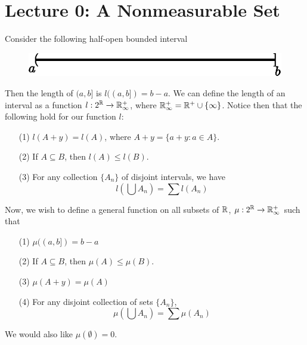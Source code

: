 \section*{Lecture 0: A Nonmeasurable Set}

Consider the following half-open bounded interval
\begin{figure}[h]
    \centering
    \includegraphics[scale=1.0]{Figures/half_open.eps}
    \caption{}
    \label{figure_1}
\end{figure}

Then the length of $(a,b]$ is $l((a,b])=b-a$. We can define the length of an
interval as a function $l:2^{\mathbb{R}} \xrightarrow{} \mathbb{R}^+_\infty$, where
$\mathbb{R}^+_\infty=\mathbb{R}^+ \cup \{\infty\}$. Notice then that the following hold for our
function $l$:
\begin{enumerate}
    \item[(1)] $l(A+y)=l(A)$, where $A+y=\{a+y : a \in A\}$.

    \item[(2)] If $A \subseteq B$, then  $l(A) \leq l(B)$.

    \item[(3)] For any collection $\{A_n\}$ of disjoint intervals, we have
        \begin{equation*}
            l(\bigcup{A_n})=\sum{l(A_n)}
        \end{equation*}
\end{enumerate}

Now, we wish to define a general function on all subsets of $\mathbb{R}$,  $\mu:2^{\mathbb{R}}
\xrightarrow{} \mathbb{R}^+_\infty$ such that
\begin{enumerate}
    \item[(1)] $\mu((a,b])=b-a$

    \item[(2)] If $A \subseteq B$, then  $\mu(A) \leq \mu(B)$.

    \item[(3)] $\mu(A+y)=\mu(A)$

    \item[(4)] For any disjoint collection of sets $\{A_n\}$,
        \begin{equation*}
            \mu(\bigcup{A_n})=\sum{\mu(A_n)}
        \end{equation*}
\end{enumerate}
We would also like $\mu(\emptyset)=0$.

